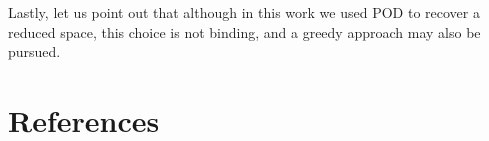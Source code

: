 \documentclass{elsarticle}
\numberwithin{equation}{section}
\theoremstyle{theorem}
\theoremstyle{definition}
\theoremstyle{remark}
\theoremstyle{proposition}
\numberwithin{figure}{section}
\begin{document}
		Lastly, let us point out that although in this work we used POD to recover a reduced space, this choice is not binding, and a greedy approach may also be pursued. 
		
		
		
	
		
	\section*{References}
		
\end{document}
